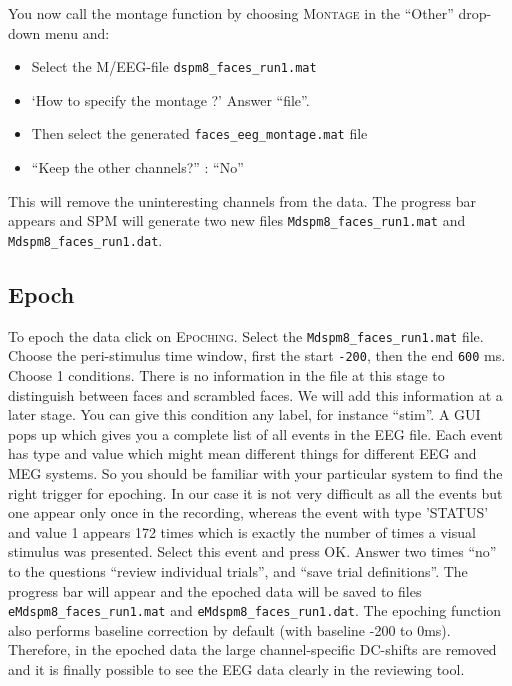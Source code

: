 You now call the montage function by choosing \textsc{Montage} in the ``Other'' drop-down menu and:
\begin{itemize}
\item{Select the M/EEG-file \texttt{dspm8\_faces_run1.mat}}
\item{`How to specify the montage ?' Answer ``file''.}
\item{Then select the generated \texttt{faces\_eeg\_montage.mat} file}
\item{``Keep the other channels?'' : ``No''}
\end{itemize}
This will remove the uninteresting channels from the data. The progress bar appears and SPM will generate two new files \texttt{Mdspm8\_faces_run1.mat} and \texttt{Mdspm8\_faces_run1.dat}.

\subsection{Epoch}
To epoch the data click on \textsc{Epoching}. Select the \texttt{Mdspm8\_faces_run1.mat} file. Choose the peri-stimulus time window, first the start \texttt{-200}, then the end \texttt{600} ms. Choose 1 conditions. There is no information in the file at this stage to distinguish between faces and scrambled faces. We will add this information at a later stage. You can give this condition any label, for instance ``stim''. A GUI pops up which gives you a complete list of all events in the EEG file. Each event has type and value which might mean different things for different EEG and MEG systems. So you should be familiar with your particular system to find the right trigger for epoching. In our case it is not very difficult as all the events but one appear only once in the recording, whereas the event with type 'STATUS' and value 1 appears 172 times which is exactly the number of times a visual stimulus was presented. Select this event and press OK. Answer two times ``no'' to the questions ``review individual trials'', and ``save trial definitions''. The progress bar will appear and the epoched data will be saved to files \texttt{eMdspm8\_faces_run1.mat} and \texttt{eMdspm8\_faces_run1.dat}. The epoching function also performs baseline correction by default (with baseline -200 to 0ms). Therefore, in the epoched data the large channel-specific DC-shifts are removed and it is finally possible to see the EEG data clearly in the reviewing tool.


